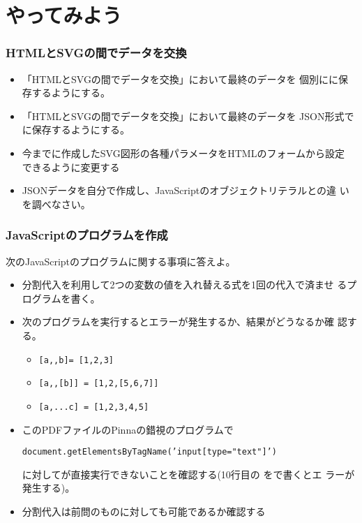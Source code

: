 \section{やってみよう}
\begin{frame}[containsverbatim]
 \frametitle{HTMLとSVGの間でデータを交換}
 \begin{itemize}
	\item 「HTMLとSVGの間でデータを交換」において最終のデータを
				個別にに保存するようにする。
	\item 「HTMLとSVGの間でデータを交換」において最終のデータを
				JSON形式でに保存するようにする。
	\item 今までに作成したSVG図形の各種パラメータをHTMLのフォームから設定
				できるように変更する
	\item JSONデータを自分で作成し、JavaScriptのオブジェクトリテラルとの違
				いを調べなさい。
 \end{itemize}
\end{frame}
\begin{frame}[containsverbatim]
 \frametitle{JavaScriptのプログラムを作成}
 次のJavaScriptのプログラムに関する事項に答えよ。
 \begin{itemize}
	\item 分割代入を利用して2つの変数の値を入れ替える式を1回の代入で済ませ
				るプログラムを書く。
	\item 次のプログラムを実行するとエラーが発生するか、結果がどうなるか確
				認する。
				\begin{itemize}
				 \item \Verb+[a,,b]= [1,2,3]+
				 \item \Verb+[a,,[b]] = [1,2,[5,6,7]]+
				 \item \Verb+[a,...c] = [1,2,3,4,5]+
				\end{itemize}
	\item このPDFファイルのPinnaの錯視のプログラムで

				\texttt{document.getElementsByTagName('input[type="text"]')}

				に対してが直接実行できないことを確認する(10行目の
				をで書くとエ
				ラーが発生する)。
	\item 分割代入は前問のものに対しても可能であるか確認する
 \end{itemize}
\end{frame}

\begin{frame}[containsverbatim]
\frametitle{}
\end{frame}
